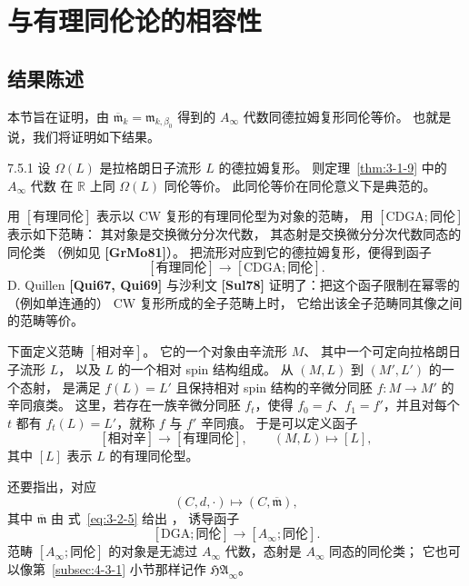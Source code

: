 
\section{与有理同伦论的相容性}
\label{sec:7-5}

\subsection{结果陈述}
\label{subsec:7-5-1}

本节旨在证明，由
$\overline{\mathfrak m}_k=\mathfrak m_{k,\beta_0}$
得到的 $A_\infty$ 代数同德拉姆复形同伦等价。
也就是说，我们将证明如下结果。

\begin{theorem}{7.5.1}\label{thm:7-5-1}
设 $\Omega(L)$ 是拉格朗日子流形 $L$ 的德拉姆复形。
则定理~\ref{thm:3-1-9} 中的 $A_\infty$ 代数
在 $\mathbb R$ 上同 $\Omega(L)$ 同伦等价。
此同伦等价在同伦意义下是典范的。
\end{theorem}

用 $[\text{有理同伦}]$ 表示以 CW 复形的有理同伦型为对象的范畴，
用 $[\mathrm{CDGA};\text{同伦}]$ 表示如下范畴：
其对象是交换微分分次代数，
其态射是交换微分分次代数同态的同伦类
（例如见 \textbf{[GrMo81]}）。
把流形对应到它的德拉姆复形，便得到函子
\[
[\text{有理同伦}]
\longrightarrow
[\mathrm{CDGA};\text{同伦}].
\]
D. Quillen \textbf{[Qui67, Qui69]} 与沙利文 \textbf{[Sul78]}
证明了：把这个函子限制在幂零的（例如单连通的）
CW 复形所成的全子范畴上时，
它给出该全子范畴同其像之间的范畴等价。

下面定义范畴 $[\text{相对辛}]$。
它的一个对象由辛流形 $M$、
其中一个可定向拉格朗日子流形 $L$，
以及 $L$ 的一个相对 spin 结构组成。
从 $(M,L)$ 到 $(M',L')$ 的一个态射，
是满足 $f(L)=L'$ 且保持相对 spin 结构的辛微分同胚
$f\colon M\to M'$ 的辛同痕类。
这里，若存在一族辛微分同胚 $f_t$，使得
$f_0=f$、$f_1=f'$，并且对每个 $t$ 都有
$f_t(L)=L'$，就称 $f$ 与 $f'$ 辛同痕。
于是可以定义函子
\[
[\text{相对辛}]
\longrightarrow
[\text{有理同伦}],
\qquad
(M,L)\longmapsto[L],
\]
其中 $[L]$ 表示 $L$ 的有理同伦型。

还要指出，对应
\[
(C,d,\mathbin{\cdot})
\longmapsto
(C,\overline{\mathfrak m}),
\]
其中 $\overline{\mathfrak m}$ 由
式~\eqref{eq:3-2-5} 给出
，
诱导函子
\[
[\mathrm{DGA};\text{同伦}]
\longrightarrow
[A_\infty;\text{同伦}].
\]
范畴 $[A_\infty;\text{同伦}]$ 的对象是无滤过
$A_\infty$ 代数，态射是 $A_\infty$ 同态的同伦类；
它也可以像第~\ref{subsec:4-3-1} 小节那样记作
$\mathfrak{HA}_\infty$。

